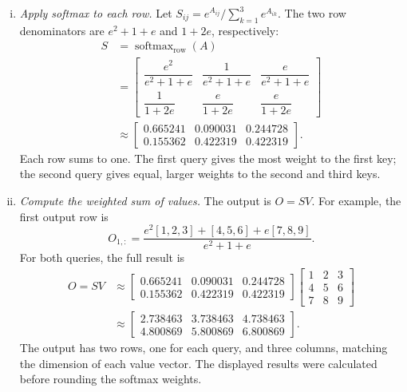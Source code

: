 \documentclass[12pt]{article}
\begin{document}
\begin{enumerate}
\begin{enumerate}[a)]
\begin{enumerate}[(i)]
            \item \emph{Apply softmax to each row.}
            Let $S_{ij}=e^{A_{ij}}/\sum_{k=1}^{3}e^{A_{ik}}$.
            The two row denominators are $e^2+1+e$ and $1+2e$, respectively:
            \[
                \begin{aligned}
                S&=\operatorname{softmax}_{\mathrm{row}}(A)\\[4pt]
                 &=\begin{bmatrix}
                    \dfrac{e^2}{e^2+1+e}&\dfrac{1}{e^2+1+e}&\dfrac{e}{e^2+1+e}\\[8pt]
                    \dfrac{1}{1+2e}&\dfrac{e}{1+2e}&\dfrac{e}{1+2e}
                 \end{bmatrix}
                \\[8pt]
                &\approx
                \boxed{\begin{bmatrix}
                    0.665241&0.090031&0.244728\\
                    0.155362&0.422319&0.422319
                \end{bmatrix}}.
                \end{aligned}
            \]
            Each row sums to one. The first query gives the most weight to
            the first key; the second query gives equal, larger weights to
            the second and third keys.

            \item \emph{Compute the weighted sum of values.}
            The output is $O=SV$. For example, the first output row is
            \[
                O_{1,:}
                =\frac{e^2[1,2,3]+[4,5,6]+e[7,8,9]}{e^2+1+e}.
            \]
            For both queries, the full result is
            \[
                \begin{aligned}
                O=SV&\approx\begin{bmatrix}
                    0.665241&0.090031&0.244728\\
                    0.155362&0.422319&0.422319
                \end{bmatrix}
                \begin{bmatrix}1&2&3\\4&5&6\\7&8&9\end{bmatrix}
                \\[8pt]
                &\approx\boxed{\begin{bmatrix}
                    2.738463&3.738463&4.738463\\
                    4.800869&5.800869&6.800869
                \end{bmatrix}}.
                \end{aligned}
            \]
            The output has two rows, one for each query, and three columns,
            matching the dimension of each value vector. The displayed
            results were calculated before rounding the softmax weights.
        \end{enumerate}
    \end{enumerate}


\end{enumerate}
\end{document}
